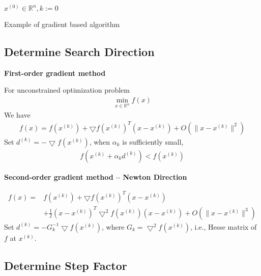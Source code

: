 \documentclass[runningheads]{llncs}
\begin{document}
\begin{algorithm}[H]
    \SetAlgoLined
     $x^{(0)} \in \mathbb{R}^n, k:= 0$\;
     \caption{Example of gradient based algorithm}
\end{algorithm}
\subsection{Determine Search Direction}
\noindent\textbf{First-order gradient method}
\par
For unconstrained optimization problem 
\begin{align}
    \min_{x \in \mathbb{R}^n} f(x)
\end{align}
We have
\begin{align}
    f(x) = f(x^{(k)}) + \bigtriangledown f(x^{(k)})^T(x - x^{(k)})
    + O(\parallel x - x^{(k)} \parallel^2)
\end{align}
Set $d^{(k)} = - \bigtriangledown f(x^{(k)})$,
when $\alpha_k$ is sufficiently small,
\begin{align}
    f(x^{(k)} + \alpha_k d^{(k)}) < f(x^{(k)})
\end{align}

\noindent\textbf{Second-order gradient method -- Newton Direction}
\par
\begin{align}
    f(x) = &f(x^{(k)}) + \bigtriangledown f(x^{(k)})^T(x - x^{(k)}) \\
    &+ \frac{1}{2} (x - x^{(k)})^T \bigtriangledown^2 f(x^{(k)}) (x - x^{(k)})
    + O(\parallel x - x^{(k)} \parallel^3)
\end{align}
Set $d^{(k)} = -G_k^{-1} \bigtriangledown f(x^{(k)})$,
 where $G_k = \bigtriangledown^2 f(x^{(k)})$,
 i.e., Hesse matrix of $f$ at $x^{(k)}$.
 \subsection{Determine Step Factor}
\end{document}
